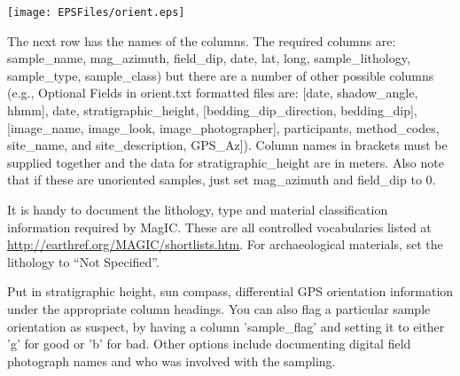 \documentclass[11pt]{book}
\begin{document}
{{  \texttt{[image: EPSFiles/orient.eps]}

 The next row has the names of the columns.  The required columns are:  sample\_name, mag\_azimuth, field\_dip, date, lat, long, sample\_lithology, sample\_type, sample\_class) but there are a number of other possible columns (e.g., Optional Fields in orient.txt formatted files are: [date, shadow\_angle, hhmm], date, stratigraphic\_height, [bedding\_dip\_direction, bedding\_dip], [image\_name, image\_look, image\_photographer], participants, method\_codes, site\_name, and site\_description, GPS\_Az]).  Column names in brackets must be supplied together and the data for stratigraphic\_height are in meters.  Also note that if these are unoriented samples, just set mag\_azimuth and field\_dip to 0.


   It is handy  to document the lithology, type and material classification information required by MagIC. These  are all controlled vocabularies listed at \url{http://earthref.org/MAGIC/shortlists.htm}.   For archaeological materials, set the lithology to ``Not Specified''.

   Put in stratigraphic height, sun compass, differential GPS orientation information under the appropriate column headings.  You can also flag a particular sample orientation as suspect, by having a column 'sample\_flag' and setting it to either 'g' for good or 'b' for bad.  Other options include documenting digital field photograph names and who was involved with the sampling.

}}
\end{document}
